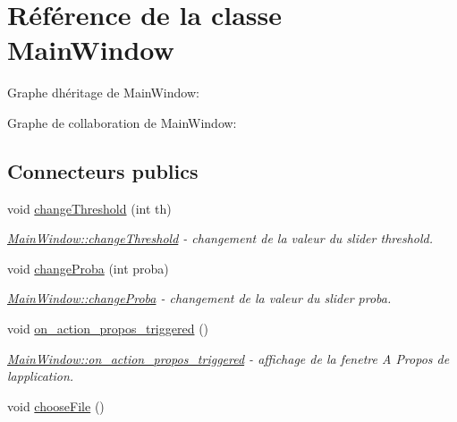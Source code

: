 \hypertarget{classMainWindow}{}\section{Référence de la classe Main\+Window}
\label{classMainWindow}


Graphe d\textquotesingle{}héritage de Main\+Window\+:


Graphe de collaboration de Main\+Window\+:
\subsection*{Connecteurs publics}
\begin{DoxyCompactItemize}
\item 
void \hyperlink{classMainWindow_ad4486efe33c8da6b53e3d14630c8dc6c}{change\+Threshold} (int th)
\begin{DoxyCompactList}\small\item\em \hyperlink{classMainWindow_ad4486efe33c8da6b53e3d14630c8dc6c}{Main\+Window\+::change\+Threshold} -\/ changement de la valeur du slider threshold. \end{DoxyCompactList}\item 
void \hyperlink{classMainWindow_ab4e79d23cef5c6a44f2cf425976c1aae}{change\+Proba} (int proba)
\begin{DoxyCompactList}\small\item\em \hyperlink{classMainWindow_ab4e79d23cef5c6a44f2cf425976c1aae}{Main\+Window\+::change\+Proba} -\/ changement de la valeur du slider proba. \end{DoxyCompactList}\item 
\mbox{\label{classMainWindow_a783335f36c6de64a0eaea17c3e658e1e}} 
void \hyperlink{classMainWindow_a783335f36c6de64a0eaea17c3e658e1e}{on\+\_\+action\+\_\+propos\+\_\+triggered} ()
\begin{DoxyCompactList}\small\item\em \hyperlink{classMainWindow_a783335f36c6de64a0eaea17c3e658e1e}{Main\+Window\+::on\+\_\+action\+\_\+propos\+\_\+triggered} -\/ affichage de la fenetre \textquotesingle{}A Propos\textquotesingle{} de l\textquotesingle{}application. \end{DoxyCompactList}\item 
\mbox{\label{classMainWindow_ad9414920d90d79a159c013deb5adbfbe}} 
void \hyperlink{classMainWindow_ad9414920d90d79a159c013deb5adbfbe}{choose\+File} ()

\end{DoxyCompactItemize}

